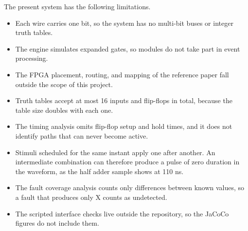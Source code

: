 The present system has the following limitations.

\begin{itemize}
\item Each wire carries one bit, so the system has no multi-bit buses or integer truth tables.
\item The engine simulates expanded gates, so modules do not take part in event processing.
\item The FPGA placement, routing, and mapping of the reference paper fall outside the scope of this project.
\item Truth tables accept at most 16 inputs and flip-flops in total, because the table size doubles with each one.
\item The timing analysis omits flip-flop setup and hold times, and it does not identify paths that can never become active.
\item Stimuli scheduled for the same instant apply one after another. An intermediate combination can therefore produce a pulse of zero duration in the waveform, as the half adder sample shows at 110 ns.
\item The fault coverage analysis counts only differences between known values, so a fault that produces only X counts as undetected.
\item The scripted interface checks live outside the repository, so the JaCoCo figures do not include them.
\end{itemize}
